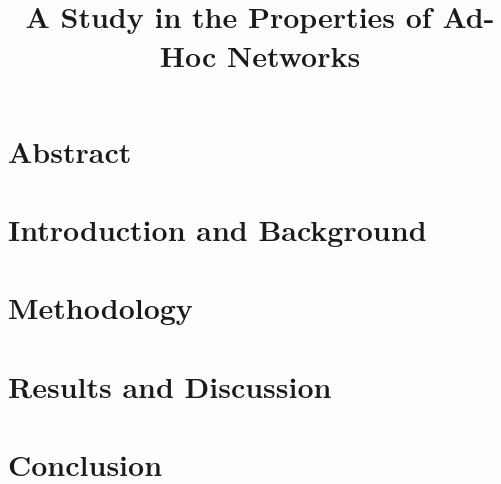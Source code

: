 \documentclass[10pt,titlepage]{article}
\author{\authorship}
\title{A Study in the Properties of Ad-Hoc Networks}
\begin{document}
    \maketitle

    \pagebreak
    \tableofcontents
    
    \pagebreak
    \section{Abstract}
    
    
    \pagebreak
    \section{Introduction and Background}
    
    
    \pagebreak
    \section{Methodology}
    
    
    \pagebreak
    \section{Results and Discussion}
    
    
    \pagebreak
    \section{Conclusion}
    

    \pagebreak
    \appendix
    \renewcommand{\thesection}{\Alph{section}}
    
    
    \pagebreak
    \small
    {}
    
\end{document}
